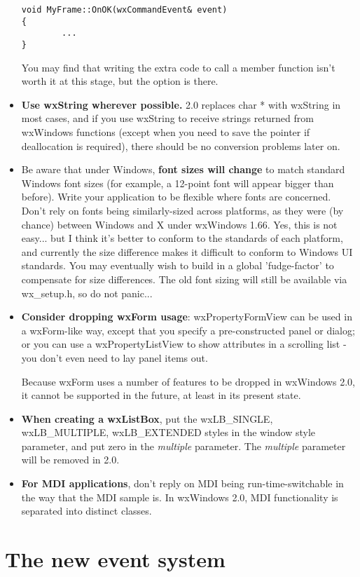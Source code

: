 \begin{itemize}
{\small\begin{verbatim}
void MyFrame::OnOK(wxCommandEvent& event)
{
        ...
}
\end{verbatim}
}%

You may find that writing the extra code to call a member function isn't worth it at this stage,
but the option is there.
\item {\bf Use wxString wherever possible.} 2.0 replaces char * with wxString
in most cases, and if you use wxString to receive strings returned from
wxWindows functions (except when you need to save the pointer if deallocation is required), there should
be no conversion problems later on.
\item Be aware that under Windows, {\bf font sizes will change} to match standard Windows
font sizes (for example, a 12-point font will appear bigger than before). Write your application
to be flexible where fonts are concerned.
Don't rely on fonts being similarly-sized across platforms, as they were (by chance) between
Windows and X under wxWindows 1.66. Yes, this is not easy... but I think it's better to conform to the
standards of each platform, and currently the size difference makes it difficult to
conform to Windows UI standards. You may eventually wish to build in a global 'fudge-factor' to compensate
for size differences. The old font sizing will still be available via wx\_setup.h, so do not panic...
\item {\bf Consider dropping wxForm usage}:
wxPropertyFormView can be used in a wxForm-like way, except that you specify a pre-constructed panel
or dialog; or you can use a wxPropertyListView to show attributes in a scrolling list - you don't even need
to lay panel items out.

Because wxForm uses a number of features to be dropped in wxWindows 2.0, it cannot be
supported in the future, at least in its present state.
\item {\bf When creating a wxListBox}, put the wxLB\_SINGLE, wxLB\_MULTIPLE, wxLB\_EXTENDED styles in the window style parameter, and put
zero in the {\it multiple} parameter. The {\it multiple} parameter will be removed in 2.0.
\item {\bf For MDI applications}, don't reply on MDI being run-time-switchable in the way that the
MDI sample is. In wxWindows 2.0, MDI functionality is separated into distinct classes.
\end{itemize}

\chapter{The new event system}\label{eventsystem}

